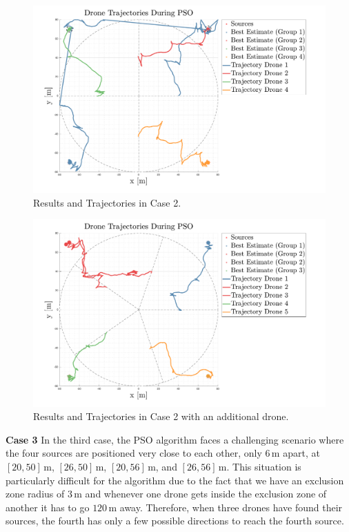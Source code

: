 \documentclass[main]{subfiles}
\begin{document}
\begin{figure}
    \centering
    \includegraphics[width=1.06\textwidth]{images/case_2.pdf}
    \caption[PSO Case 2]{Results and Trajectories in Case 2.}
    \label{fig:case2}
\end{figure}
\begin{figure}[H]
    \centering
    \includegraphics[width=1.06\textwidth]{images/case_2_more.pdf}
    \caption[PSO Case 2]{Results and Trajectories in Case 2 with an additional drone.}
    \label{fig:case2more}
\end{figure}

\textbf{Case 3}
In the third case, the PSO algorithm faces a challenging scenario where 
the four sources are positioned very close to each other, only \(6 \, \text{m}\) apart, 
at \([20, 50] \, \text{m}\), \([26, 50] \, \text{m}\), \([20, 56] \, \text{m}\), and \([26, 56] \, \text{m}\). 
This situation is particularly difficult for the algorithm due to 
the fact that we have an exclusion zone radius of \(3 \, \text{m}\) and 
whenever one drone gets inside the exclusion zone of another
it has to go \(120 \, \text{m}\) away.
Therefore, when three drones have found their sources, the fourth has only a few
possible directions to reach the fourth source.
\end{document}
